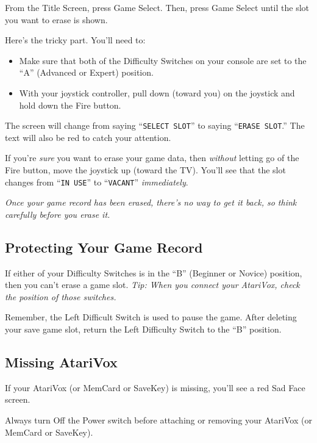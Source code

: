 \documentclass[12pt,twoside,openright,book]{memoir}
\begin{document}
From the Title Screen, press Game  Select. Then, press Game Select until
the slot you want to erase is shown.

Here's the tricky part. You'll need to:

\begin{itemize}
\item Make sure that both of the Difficulty Switches on your console
  are set to the ``A'' (Advanced or Expert) position.
\item With your joystick controller, pull down (toward you) on the
  joystick and hold down the Fire button.
\end{itemize}

The screen  will change from  saying ``\texttt{SELECT SLOT}''  to saying
``\texttt{ERASE  SLOT}.''   The  text   will  also   be  red   to  catch
your attention.

If  you're  \emph{sure}   you  want  to  erase  your   game  data,  then
\emph{without}  letting go  of the  Fire  button, move  the joystick  up
(toward  the TV).  You'll see  that the  slot changes  from ``\texttt{IN
  USE}'' to ``\texttt{VACANT}'' \emph{immediately}.

\emph{Once your  game record has been  erased, there's no way  to get it
  back, so think carefully before you erase it.}

\subsection{Protecting Your Game Record}

If  either of  your Difficulty  Switches is  in the  ``B'' (Beginner  or
Novice) position, then you can't erase  a game slot. \emph{Tip: When you
  connect your AtariVox, check the position of those switches.}

\ifdef\TVSECAM
Remember,  the  Left  Difficult  Switch  is  used  to  pause  the  game.
After deleting your save game slot, return the Left Difficulty Switch to
the ``B'' position.
\fi

\subsection{Missing AtariVox}

If your  AtariVox (or MemCard or  SaveKey) is missing, you'll  see a red
Sad Face screen.

Always  turn Off  the Power  switch  before attaching  or removing  your
AtariVox (or MemCard or SaveKey).
\end{document}
